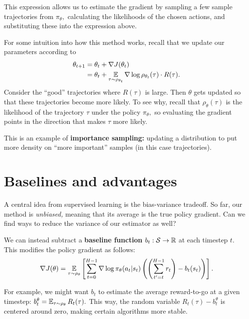 \documentclass[../main/main]{subfiles}
\begin{document}
This expression allows us to estimate the gradient by sampling a few sample trajectories from $\pi_\theta,$ calculating the likelihoods of the chosen actions, and substituting these into the expression above.

For some intuition into how this method works, recall that we update our parameters according to \[
    \begin{split}
        \theta_{t+1} &= \theta_t + \nabla J(\theta_t) \\
        &= \theta_t + \operatorname*{\mathbb{E}}_{\tau \sim \rho_{\theta_t}} \nabla \log \rho_{\theta_t}(\tau) \cdot R(\tau).
    \end{split}
\]
Consider the ``good'' trajectories where $R(\tau)$ is large. Then $\theta$ gets updated so that these trajectories become more likely. To see why, recall that $\rho_{\theta}(\tau)$ is the likelihood of the trajectory $\tau$ under the policy $\pi_\theta,$ so evaluating the gradient points in the direction that makes $\tau$ more likely.

This is an example of \textbf{importance sampling:} updating a distribution to put more density on ``more important'' samples (in this case trajectories).

\section{Baselines and advantages}


A central idea from supervised learning is the bias-variance tradeoff. So far, our method is \emph{unbiased,} meaning that its average is the true policy gradient. Can we find ways to reduce the variance of our estimator as well?

We can instead subtract a \textbf{baseline function} $b_t : \mathcal{S} \to \mathbb{R}$ at each timestep $t.$ This modifies the policy gradient as follows: \[
    \nabla J(\theta) = \operatorname*{\mathbb{E}}_{\tau \sim \rho_\theta} \left[
        \sum_{t=0}^{H-1} \nabla \log \pi_\theta (a_t | s_t) \left(
            \left(
                \sum_{t' = t}^{H-1} r_t
            \right)
            - b_t(s_t)
        \right)
    \right].
\]

For example, we might want $b_t$ to estimate the average reward-to-go at a given timestep: $b_t^\theta = \operatorname*{\mathbb{E}}_{\tau \sim \rho_\theta} R_t(\tau).$ This way,
the random variable $R_t(\tau) - b_t^\theta$ is centered around zero,
making certain algorithms more stable.
\end{document}

